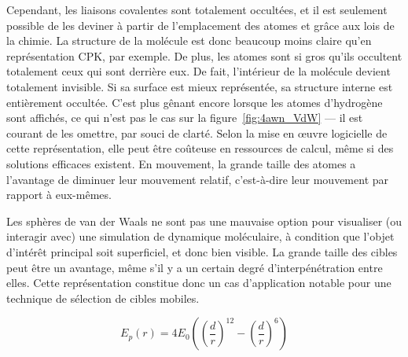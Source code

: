 	Cependant, les liaisons covalentes sont totalement occultées, et il est seulement possible de les \og deviner \fg{} à partir de l'emplacement des atomes et grâce aux lois de la chimie. La structure de la molécule est donc beaucoup moins claire qu'en représentation CPK, par exemple. De plus, les atomes sont si gros qu'ils occultent totalement ceux qui sont derrière eux. De fait, l'intérieur de la molécule devient totalement invisible. Si sa surface est mieux représentée, sa structure interne est entièrement occultée. C'est plus gênant encore lorsque les atomes d'hydrogène sont affichés, ce qui n'est pas le cas sur la figure~\ref{fig:4awn_VdW} --- il est courant de les omettre, par souci de clarté. Selon la mise en \oe{}uvre logicielle de cette représentation, elle peut être coûteuse en ressources de calcul, même si des solutions efficaces existent. En mouvement, la grande taille des atomes a l'avantage de diminuer leur mouvement relatif, c'est-à-dire leur mouvement par rapport à eux-mêmes.
		
	Les sphères de van der Waals ne sont pas une mauvaise option pour visualiser (ou interagir avec) une simulation de dynamique moléculaire, à condition que l'objet d'intérêt principal soit superficiel, et donc bien visible. La grande taille des cibles peut être un avantage, même s'il y a un certain degré d'interpénétration entre elles. Cette représentation constitue donc un cas d'application notable pour une technique de sélection de cibles mobiles.
		
	\begin{equation}
	    \label{eq:lennard}
	    E_{p}\left(r\right) = 4E_{0} \left( \left(\frac{d}{r}\right)^{12} - \left(\frac{d}{r}\right)^{6} \right)
	\end{equation}
		
